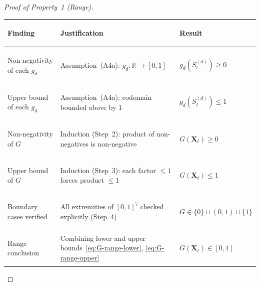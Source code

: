\documentclass[12pt,openany]{book}
\numberwithin{equation}{chapter}
\theoremstyle{plain}
\theoremstyle{definition}
\theoremstyle{remark}
\def\mathcal#1{#1}%
\begin{document}
\begin{proof}[Proof of Property~1 (Range)]
\begin{center}
\begin{tabularx}{\linewidth}{%
  >{\bfseries\raggedright\arraybackslash}p{3.2cm}
  >{\raggedright\arraybackslash}X
  >{\centering\arraybackslash}p{2.6cm}}
\toprule
\textbf{Finding} & \textbf{Justification} & \textbf{Result} \\
\midrule
Non-negativity of each $g_d$ &
  Assumption~(A4a): $g_d : \mathbb{R} \to [0,1]$ &
  $g_d(\mathcal{S}_t^{(d)}) \geq 0$ \\
\addlinespace
Upper bound of each $g_d$ &
  Assumption~(A4a): codomain bounded above by $1$ &
  $g_d(\mathcal{S}_t^{(d)}) \leq 1$ \\
\addlinespace
Non-negativity of $G$ &
  Induction (Step~2): product of non-negatives is
  non-negative &
  $G(\mathbf{X}_t) \geq 0$ \\
\addlinespace
Upper bound of $G$ &
  Induction (Step~3): each factor $\leq 1$ forces
  product $\leq 1$ &
  $G(\mathbf{X}_t) \leq 1$ \\
\addlinespace
Boundary cases verified &
  All extremities of $[0,1]^7$ checked explicitly
  (Step~4) &
  $G \in \{0\} \cup (0,1) \cup \{1\}$ \\
\addlinespace
Range conclusion &
  Combining lower and upper bounds~\eqref{eq:G-range-lower},
  \eqref{eq:G-range-upper} &
  $G(\mathbf{X}_t) \in [0,1]$ \\
\bottomrule
\end{tabularx}
\end{center}

\end{proof}
\end{document}
